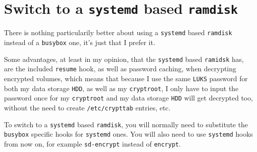\documentclass[9pt]{report}
\newenvironment{NOTE}
{\begin{tcolorbox}[colback=admonitionBG,coltitle=draculaFG,colframe=draculaBlue,colbacktitle=draculaBlue,title=NOTE]}
{\end{tcolorbox}}
\begin{document}
\hypertarget{x-switch-to-a-systemd-based-ramdisk}{\section{Switch to a \texttt{systemd} based \texttt{ramdisk}}}
\begin{NOTE}
    There is nothing particularily better about using a \texttt{systemd} based \texttt{ramdisk} instead of a \texttt{busybox} one, it’s just that I prefer it.


    Some advantages, at least in my opinion, that the \texttt{systemd} based \texttt{ramidsk} has, are the included \texttt{resume} hook, as well as password caching, when decrypting encrypted volumes, which means that because I use the same \texttt{LUKS} password for both my data storage \texttt{HDD}, as well as my \texttt{cryptroot}, I only have to input the password once for my \texttt{cryptroot} and my data storage \texttt{HDD} will get decrypted too, without the need to create \texttt{/etc/crypttab} entries, etc.

\end{NOTE}
To switch to a \texttt{systemd} based \texttt{ramdisk}, you will normally need to substitute the \texttt{busybox} specific hooks for \texttt{systemd} ones.
You will also need to use \texttt{systemd} hooks from now on, for example \texttt{sd-encrypt} instead of \texttt{encrypt}.
\end{document}
